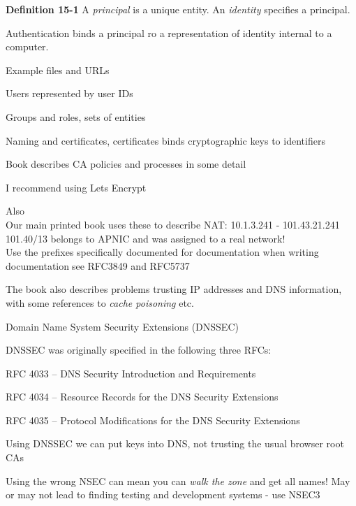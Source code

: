 \documentclass[Screen16to9,17pt]{foils}
\begin{document}
\begin{list1}
\item
\item {\bf Definition 15-1} A \emph{principal} is a unique entity. An \emph{identity} specifies a principal.
\item Authentication binds a principal ro a representation of identity internal to a computer.
\item Example files and URLs
\item Users represented by user IDs
\item Groups and roles, sets of entities

\end{list1}



\begin{list1}
\item Naming and certificates, certificates binds cryptographic keys to identifiers
\item Book describes CA policies and processes in some detail
\item I recommend using Lets Encrypt 
\item Also\\
Our main printed book uses these to describe NAT: 10.1.3.241 - 101.43.21.241\\
101.40/13 belongs to APNIC and was assigned to a real network!\\
Use the prefixes specifically documented for documentation when writing documentation🙏see RFC3849 and RFC5737
\item The book also describes problems trusting IP addresses and DNS information, with some references to \emph{cache poisoning} etc.
\end{list1}

\begin{list1}
\item Domain Name System Security Extensions (DNSSEC)
\item DNSSEC was originally specified in the following three RFCs:
\item RFC 4033 – DNS Security Introduction and Requirements
\item RFC 4034 – Resource Records for the DNS Security Extensions
\item RFC 4035 – Protocol Modifications for the DNS Security Extensions\\
\item Using DNSSEC we can put keys into DNS, not trusting the usual browser root CAs
\item Using the wrong NSEC can mean you can \emph{walk the zone} and get all names! May or may not lead to finding testing and development systems - use NSEC3
\end{list1}
\end{document}
